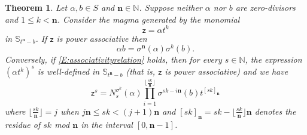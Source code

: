\documentclass[11pt]{amsart}
\theoremstyle{plain}
\newtheorem{theorem}{Theorem}[section]
\theoremstyle{definition}
\numberwithin{equation}{section}
\numberwithin{figure}{section}
\newcommand{\ring}{S}
\newcommand{\scz}{\mathsf{z}}  %
\newcommand{\de}{\mathbf{n}}  %
\newcommand{\N}{\mathbb{N}}
\begin{document}
\begin{theorem}\label{T:powerassociative}
    Let $\alpha, b\in \ring$ and ${\de}\in \N$.  Suppose neither $\alpha$ nor $b$ are zero-divisors and $1\leq k <{\de}$.  Consider the magma generated by the monomial
    $$
    \scz=\alpha t^k
    $$
    in $\mathbb{S}_{t^\de-b}$. 
    If $\scz$ is power associative then
\begin{equation}\label{E:associativityrelation}
    \alpha b = \sigma^{\de}(\alpha)\sigma^k(b).
    \end{equation}
    Conversely, if \eqref{E:associativityrelation} holds, then  for every $s\in \mathbb{N}$, the expression $(\alpha t^k)^s$ is well-defined in $\mathbb{S}_{t^\de-b}$ 
    (that is, $\scz$ is power associative) and we have
    \begin{equation}\label{G(t)^s}
    \scz^s = N_{s}^{\sigma^k}(\alpha)\prod_{i=1}^{\lfloor \frac{sk}{{\de}}\rfloor} \sigma^{sk-i{\de}}(b)t^{[sk]_{\de}}
    \end{equation}
    where $\lfloor \frac{sk}{\de}\rfloor=j$ when $j{\de}\leq sk<(j+1){\de}$ and $[sk]_{\de} = sk-\lfloor \frac{sk}{\de}\rfloor \de$ denotes the residue of $sk$ mod $\de$ in the interval $[0,\de-1]$.
\end{theorem}
\end{document}
